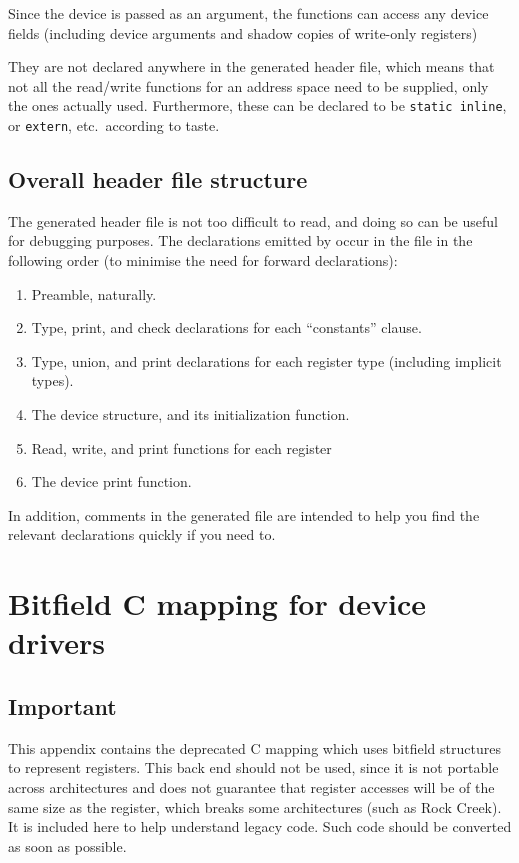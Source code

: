 \documentclass[a4paper,11pt,twoside]{report}
\begin{document}
Since the device is passed as an argument, the functions can access
any device fields (including device arguments and shadow copies of
write-only registers) 

They are not
declared anywhere in the generated header file, which means that not
all the read/write functions for an 
address space need to be supplied, only the ones actually used.
Furthermore, these can be declared to be \texttt{static inline}, or
\texttt{extern}, etc.\ according to taste.

\section{Overall header file structure}

The generated header file is not too difficult to read, and doing so
can be useful for debugging purposes.  The declarations emitted by
\Mac occur in the file in the following order (to minimise the need
for forward declarations):

\begin{enumerate}
\item Preamble, naturally.
\item Type, print, and check declarations for each ``constants''
  clause.
\item Type, union, and print declarations for each register type
  (including implicit types). 
\item The device structure, and its initialization function.
\item Read, write, and print functions for each register
\item The device print function. 
\end{enumerate}

In addition, comments in the generated file are intended to help you
find the relevant declarations quickly if you need to. 
 
\chapter{Bitfield C mapping for device drivers}\label{chap:bitfielddriver} 

\section*{Important}
This appendix contains the deprecated C mapping which uses bitfield
structures to represent registers.  This back end should not be used,
since it is not portable across architectures and does not guarantee
that register accesses will be of the same size as the register, which
breaks some architectures (such as Rock Creek).   It is included here
to help understand legacy code.  Such code should be converted as soon
as possible. 
\end{document}
